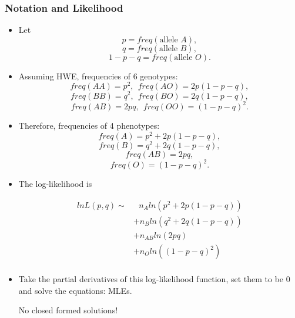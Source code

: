 \documentclass[10pt]{beamer}
\begin{document}
\begin{frame}
\frametitle{Notation and Likelihood} 

\begin{itemize}

\item Let
{\small
$$p=freq(\mbox{allele } A),$$
$$q=freq(\mbox{allele } B),$$
$$1-p-q=freq(\mbox{allele } O).$$
}

\item Assuming HWE, frequencies of 6 genotypes:
{\small
$$freq(AA)=p^2, \: \:  freq(AO)=2p(1-p-q),$$
$$freq(BB)=q^2, \: \: freq(BO)=2q(1-p-q),$$
$$freq(AB)=2pq, \: \: freq(OO)=(1-p-q)^2.$$
}

\item Therefore, frequencies of 4 phenotypes:
{\small
$$freq(A)=p^2+2p(1-p-q),$$
$$freq(B)=q^2+2q(1-p-q),$$
$$freq(AB)=2pq,$$
$$freq(O)=(1-p-q)^2.$$
}
\pagebreak

\item The log-likelihood is

\begin{align*}
lnL(p,q) \sim& \mbox{ } n_A ln(p^2+2p(1-p-q))\\
&+n_Bln(q^2+2q(1-p-q))\\
& +n_{AB} ln(2pq)\\
& + n_O ln((1-p-q)^2)\\
\end{align*}

\item Take the partial derivatives of this log-likelihood function, set them to be 0 and solve the equations: MLEs.\\
\smallskip
\centerline{No closed formed solutions!}
\end{itemize}

\end{frame}
\end{document}
